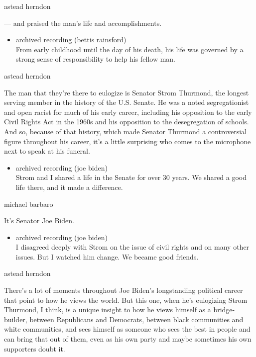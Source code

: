 astead herndon

--- and praised the man's life and accomplishments.

\begin{itemize}
\tightlist
\item
  archived recording (bettis rainsford)\\
  From early childhood until the day of his death, his life was governed
  by a strong sense of responsibility to help his fellow man.
\end{itemize}

astead herndon

The man that they're there to eulogize is Senator Strom Thurmond, the
longest serving member in the history of the U.S. Senate. He was a noted
segregationist and open racist for much of his early career, including
his opposition to the early Civil Rights Act in the 1960s and his
opposition to the desegregation of schools. And so, because of that
history, which made Senator Thurmond a controversial figure throughout
his career, it's a little surprising who comes to the microphone next to
speak at his funeral.

\begin{itemize}
\tightlist
\item
  archived recording (joe biden)\\
  Strom and I shared a life in the Senate for over 30 years. We shared a
  good life there, and it made a difference.
\end{itemize}

michael barbaro

It's Senator Joe Biden.

\begin{itemize}
\tightlist
\item
  archived recording (joe biden)\\
  I disagreed deeply with Strom on the issue of civil rights and on many
  other issues. But I watched him change. We became good friends.
\end{itemize}

astead herndon

There's a lot of moments throughout Joe Biden's longstanding political
career that point to how he views the world. But this one, when he's
eulogizing Strom Thurmond, I think, is a unique insight to how he views
himself as a bridge-builder, between Republicans and Democrats, between
black communities and white communities, and sees himself as someone who
sees the best in people and can bring that out of them, even as his own
party and maybe sometimes his own supporters doubt it.

